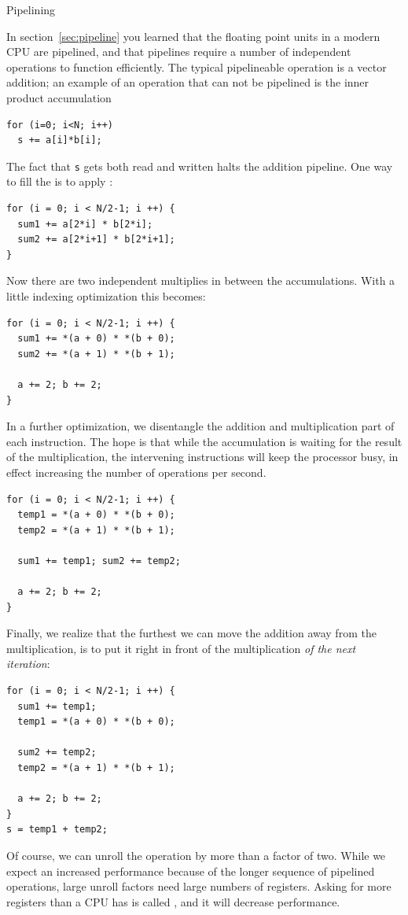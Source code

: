 
 {Pipelining}
\label{sec:coding-pipeline}

In section~\ref{sec:pipeline} you learned that the floating point
units in a modern CPU are pipelined, and that pipelines require a
number of independent operations to function efficiently. The typical
pipelineable operation is a vector addition; an example of an
operation that can not be pipelined is the inner product accumulation
\begin{lstlisting}
for (i=0; i<N; i++)
  s += a[i]*b[i];
\end{lstlisting}
The fact that \lstinline{s} gets both read and written halts the addition
pipeline. One way to fill the 
is to apply :
\begin{lstlisting}
for (i = 0; i < N/2-1; i ++) {
  sum1 += a[2*i] * b[2*i];
  sum2 += a[2*i+1] * b[2*i+1];
}
\end{lstlisting}
Now there are two independent multiplies in between the accumulations.
With a little indexing optimization this becomes:
\begin{lstlisting}
for (i = 0; i < N/2-1; i ++) {
  sum1 += *(a + 0) * *(b + 0);
  sum2 += *(a + 1) * *(b + 1);

  a += 2; b += 2;
}
\end{lstlisting}

In a further optimization, we disentangle the addition and
multiplication part of each instruction. The hope is that while the
accumulation is waiting for the result of the multiplication, the
intervening instructions will keep the processor busy, in effect
increasing the number of operations per second.
\begin{lstlisting}
for (i = 0; i < N/2-1; i ++) {
  temp1 = *(a + 0) * *(b + 0);
  temp2 = *(a + 1) * *(b + 1);

  sum1 += temp1; sum2 += temp2;

  a += 2; b += 2;
}
\end{lstlisting}
Finally, we realize that the furthest we can move the addition away
from the multiplication, is to put it right in front of the
multiplication \emph{of the next iteration}:
\begin{lstlisting}
for (i = 0; i < N/2-1; i ++) {
  sum1 += temp1;
  temp1 = *(a + 0) * *(b + 0);

  sum2 += temp2;
  temp2 = *(a + 1) * *(b + 1);

  a += 2; b += 2;
}
s = temp1 + temp2;
\end{lstlisting}
Of course, we can unroll the operation by more than a factor of
two. While we expect an increased performance because of the longer
sequence of pipelined operations, large unroll factors
need large numbers of registers. Asking for more registers than a CPU
has is called , and it will decrease
performance.

